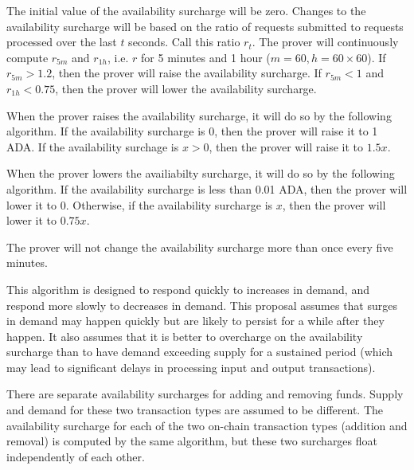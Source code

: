 \documentclass[12pt]{article}
\begin{document}
The initial value of the availability surcharge will be zero. Changes to the availability surcharge will be based on the ratio of requests submitted to requests processed over the last $t$ seconds. Call this ratio $r_t$. The prover will continuously compute $r_{5m}$ and $r_{1h}$, i.e. $r$ for 5 minutes and 1 hour ($m = 60, h = 60 \times 60$). If $r_{5m} > 1.2$, then the prover will raise the availability surcharge. If $r_{5m} < 1$ and $r_{1h} < 0.75$, then the prover will lower the availability surcharge.

When the prover raises the availability surcharge, it will do so by the following algorithm. If the availability surcharge is 0, then the prover will raise it to 1 ADA. If the availability surchage is $x > 0$, then the prover will raise it to $1.5x$.

When the prover lowers the availiabilty surcharge, it will do so by the following algorithm. If the availability surcharge is less than 0.01 ADA, then the prover will lower it to 0. Otherwise, if the availability surcharge is $x$, then the prover will lower it to $0.75x$.

The prover will not change the availability surcharge more than once every five minutes.

This algorithm is designed to respond quickly to increases in demand, and respond more slowly to decreases in demand. This proposal assumes that surges in demand may happen quickly but are likely to persist for a while after they happen. It also assumes that it is better to overcharge on the availability surcharge than to have demand exceeding supply for a sustained period (which may lead to significant delays in processing input and output transactions).

There are separate availability surcharges for adding and removing funds. Supply and demand for these two transaction types are assumed to be different. The availability surcharge for each of the two on-chain transaction types (addition and removal) is computed by the same algorithm, but these two surcharges float independently of each other.
\end{document}
